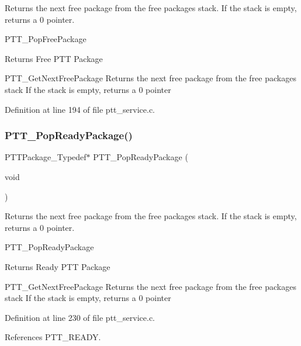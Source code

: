 Returns the next free package from the free packages stack. If the stack is empty, returns a 0 pointer. 

P\+T\+T\+\_\+\+Pop\+Free\+Package \begin{DoxyReturn}{Returns}
Free P\+TT Package
\end{DoxyReturn}
P\+T\+T\+\_\+\+Get\+Next\+Free\+Package Returns the next free package from the free packages stack If the stack is empty, returns a 0 pointer 

Definition at line 194 of file ptt\+\_\+service.\+c.

\mbox{\label{group___p_t_t___service_gadc0586652f7800ac7d8f5fc1602e9413}} 
\subsubsection{\texorpdfstring{P\+T\+T\+\_\+\+Pop\+Ready\+Package()}{PTT\_PopReadyPackage()}}
{\footnotesize\ttfamily P\+T\+T\+Package\+\_\+\+Typedef$\ast$ P\+T\+T\+\_\+\+Pop\+Ready\+Package (\begin{DoxyParamCaption}\item[{void}]{ }\end{DoxyParamCaption})}



Returns the next free package from the free packages stack. If the stack is empty, returns a 0 pointer. 

P\+T\+T\+\_\+\+Pop\+Ready\+Package \begin{DoxyReturn}{Returns}
Ready P\+TT Package
\end{DoxyReturn}
P\+T\+T\+\_\+\+Get\+Next\+Free\+Package Returns the next free package from the free packages stack If the stack is empty, returns a 0 pointer 

Definition at line 230 of file ptt\+\_\+service.\+c.



References P\+T\+T\+\_\+\+R\+E\+A\+DY.

\mbox{\label{group___p_t_t___service_gabee25d161901d349ca414c842d1d40c1}} 
